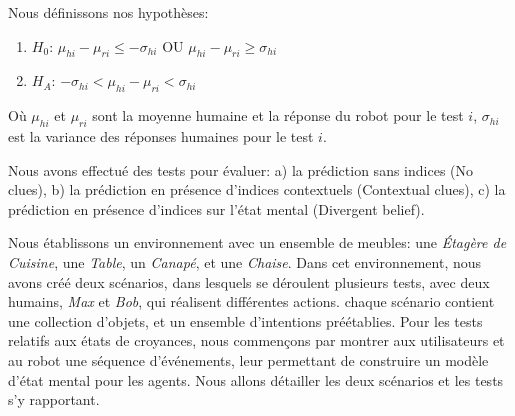 \documentclass[a4paper,11pt,twoside]{StyleThese}
\begin{document}
Nous définissons nos hypothèses:

\begin{enumerate}
\item $H_0$: $\mu_{hi}-\mu_{ri}\leq-\sigma_{hi}$ OU $\mu_{hi}-\mu_{ri}\geq\sigma_{hi}$
\item $H_A$: $-\sigma_{hi}<\mu_{hi}-\mu_{ri}<\sigma_{hi}$
\end{enumerate}

Où $\mu_{hi}$ et $\mu_{ri}$ sont la moyenne humaine et la réponse du robot pour le test $i$, $\sigma_{hi}$ est la variance des réponses humaines pour le test $i$.

Nous avons effectué des tests pour évaluer: a) la prédiction sans indices (No clues), b) la prédiction en présence d'indices contextuels (Contextual clues), c) la prédiction en présence d'indices sur l'état mental (Divergent belief).

Nous établissons un environnement avec un ensemble de meubles: une \textit{Étagère de Cuisine}, une \textit{Table}, un \textit{Canapé}, et une \textit{Chaise}. Dans cet environnement, nous avons créé deux scénarios, dans lesquels se déroulent plusieurs tests, avec deux humains, \textit{Max} et \textit{Bob}, qui réalisent différentes actions. chaque scénario contient une collection d'objets, et un ensemble d'intentions préétablies. Pour les tests relatifs aux états de croyances, nous commençons par montrer aux utilisateurs et au robot une séquence d'événements, leur permettant de construire un modèle d'état mental pour les agents. Nous allons détailler les deux scénarios et les tests s'y rapportant.
\end{document}
